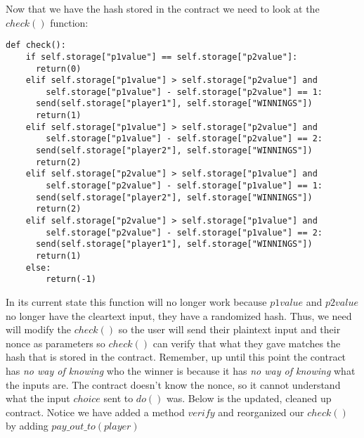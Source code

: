 \documentclass[12pt]{article}
\begin{document}
Now that we have the hash stored in the contract we need to look at the $check()$ function:

\begin{lstlisting}[frame=single]
def check():
	if self.storage["p1value"] == self.storage["p2value"]:
	  return(0)
	elif self.storage["p1value"] > self.storage["p2value"] and 
	    self.storage["p1value"] - self.storage["p2value"] == 1:
	  send(self.storage["player1"], self.storage["WINNINGS"]) 
	  return(1)
	elif self.storage["p1value"] > self.storage["p2value"] and 
	    self.storage["p1value"] - self.storage["p2value"] == 2:
	  send(self.storage["player2"], self.storage["WINNINGS"])
	  return(2)
	elif self.storage["p2value"] > self.storage["p1value"] and 
	    self.storage["p2value"] - self.storage["p1value"] == 1:
	  send(self.storage["player2"], self.storage["WINNINGS"])		
	  return(2)
	elif self.storage["p2value"] > self.storage["p1value"] and 
	    self.storage["p2value"] - self.storage["p1value"] == 2:
	  send(self.storage["player1"], self.storage["WINNINGS"])		
	  return(1)
	else:
		return(-1)
\end{lstlisting}

In its current state this function will no longer work because $p1value$ and $p2value$ no longer have the cleartext input, they have a randomized hash. Thus, we need will modify the $check()$ so the user will send their plaintext input and their nonce as parameters so $check()$ can verify that what they gave matches the hash that is stored in the contract. Remember, up until this point the contract has \textit{no way of knowing} who the winner is because it has \textit{no way of knowing} what the inputs are. The contract doesn't know the nonce, so it cannot understand what the input $choice$ sent to $do()$ was. Below is the updated, cleaned up contract. Notice we have added a method $verify$ and reorganized our $check()$ by adding $pay\_out\_to(player)$
\end{document}
